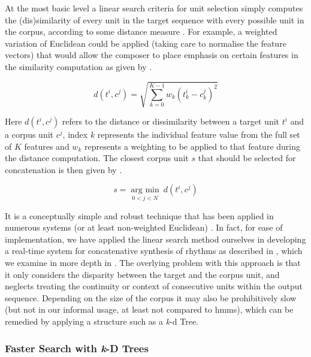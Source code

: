 {{{{{{{At the most basic level a linear search criteria for unit selection simply computes the (dis)similarity of every unit in the target sequence with every possible unit in the corpus, according to some distance measure \citep{Schwarz2011}. For example, a weighted variation of Euclidean could be applied (taking care to normalise the feature vectors) that would allow the composer to place emphasis on certain features in the similarity computation as given by .

\begin{equation}
\label{eq:linear_search}
d(t^i, c^j) = \sqrt{\sum_{k=0}^{K-1}w_k(t^i_k-c^j_k)^2}
\end{equation}

Here $d(t^i, c^j)$ refers to the distance or dissimilarity between a target unit $t^i$ and a corpus unit $c^j$, index $k$ represents the individual feature value from the full set of $K$ features and $w_k$ represents a weighting to be applied to that feature during the distance computation. The closest corpus unit $s$ that should be selected for concatenation is then given by .

\begin{equation}
\label{eq:linear_search_argmin}
s = \operatorname*{arg\ min}_{0<j<N}\ d(t^i, c^j)
\end{equation}

 It is a conceptually simple and robust technique that has been applied in numerous systems (or at least non-weighted Euclidean) \citep{Dannenberg2006, Maestre2006, Sturm2006, Collins2007,  Stoll2013}. In fact, for ease of implementation, we have applied the linear search method ourselves in developing a real-time system for concatenative synthesis of rhythms as described in \citep{Nuanain2016a, ONuanain2017a}, which we examine in more depth in . The overlying problem with this approach is that it only considers the disparity between the target and the corpus unit, and neglects treating the continuity or context of consecutive units within the output sequence. Depending on the size of the corpus it may also be prohibitively slow (but not in our informal usage, at least not compared to \acrshort{hmm}s), which can be remedied by applying a structure such as a \textit{k}-d Tree.

\subsubsection{Faster Search with \textit{k}-D Trees}

}}}}}}}

